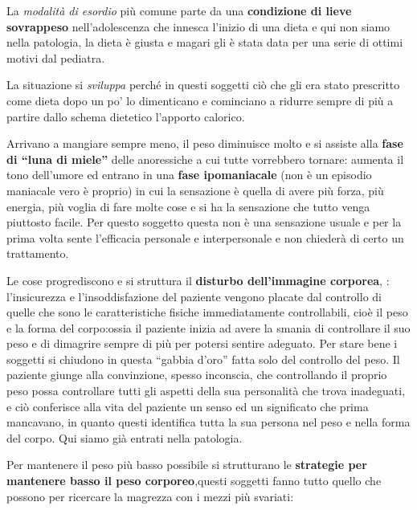 La \emph{\emph{modalità di esordio}} più comune parte da una
\textbf{condizione di lieve sovrappeso} nell'adolescenza che innesca
l'inizio di una dieta e qui non siamo nella patologia, la dieta è giusta
e magari gli è stata data per una serie di ottimi motivi dal pediatra.

La situazione si \emph{\emph{sviluppa}} perché in questi soggetti ciò
che gli era stato prescritto come dieta dopo un po' lo dimenticano e
cominciano a ridurre sempre di più a partire dallo schema dietetico
l'apporto calorico.

Arrivano a mangiare sempre meno, il peso diminuisce molto e si assiste
alla \textbf{fase di ``luna di miele''} delle anoressiche a cui tutte
vorrebbero tornare: aumenta il tono dell'umore ed entrano in una
\textbf{fase ipomaniacale} (non è un episodio maniacale vero è proprio)
in cui la sensazione è quella di avere più forza, più energia, più
voglia di fare molte cose e si ha la sensazione che tutto venga
piuttosto facile. Per questo soggetto questa non è una sensazione usuale
e per la prima volta sente l'efficacia personale e interpersonale e non
chiederà di certo un trattamento.

Le cose progrediscono e si struttura il \textbf{disturbo dell'immagine
corporea}, : l'insicurezza e l'insoddisfazione del paziente vengono
placate dal controllo di quelle che sono le caratteristiche fisiche
immediatamente controllabili, cioè il peso e la forma del corpo:ossia il
paziente inizia ad avere la smania di controllare il suo peso e di
dimagrire sempre di più per potersi sentire adeguato. Per stare bene i
soggetti si chiudono in questa ``gabbia d'oro'' fatta solo del controllo
del peso. Il paziente giunge alla convinzione, spesso inconscia, che
controllando il proprio peso possa controllare tutti gli aspetti della
sua personalità che trova inadeguati, e ciò conferisce alla vita del
paziente un senso ed un significato che prima mancavano, in quanto
questi identifica tutta la sua persona nel peso e nella forma del corpo.
Qui siamo già entrati nella patologia.

Per mantenere il peso più basso possibile si strutturano le
\textbf{strategie per mantenere basso il peso corporeo},questi soggetti
fanno tutto quello che possono per ricercare la magrezza con i mezzi più
svariati:

